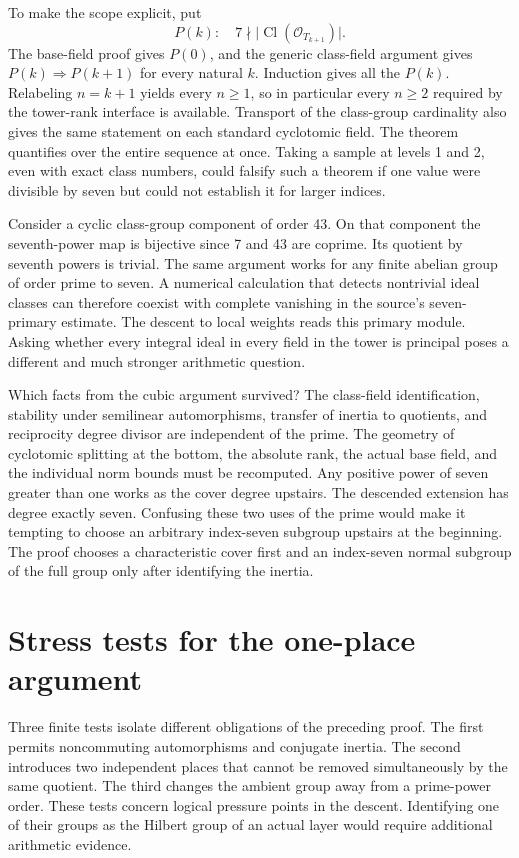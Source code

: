 \documentclass[12pt,letterpaper]{article}
\begin{document}
To make the scope explicit, put
\[
P(k):\quad 7\nmid \big|\operatorname{Cl}(\mathcal O_{T_{k+1}})\big|.
\]
The base-field proof gives \(P(0)\), and the generic class-field argument gives \(P(k)\Rightarrow P(k+1)\) for every natural \(k\). Induction gives all the \(P(k)\). Relabeling \(n=k+1\) yields every \(n\ge1\), so in particular every \(n\ge2\) required by the tower-rank interface is available. Transport of the class-group cardinality also gives the same statement on each standard cyclotomic field. The theorem quantifies over the entire sequence at once. Taking a sample at levels 1 and 2, even with exact class numbers, could falsify such a theorem if one value were divisible by seven but could not establish it for larger indices.

Consider a cyclic class-group component of order 43. On that component the seventh-power map is bijective since 7 and 43 are coprime. Its quotient by seventh powers is trivial. The same argument works for any finite abelian group of order prime to seven. A numerical calculation that detects nontrivial ideal classes can therefore coexist with complete vanishing in the source's seven-primary estimate. The descent to local weights reads this primary module. Asking whether every integral ideal in every field in the tower is principal poses a different and much stronger arithmetic question.

Which facts from the cubic argument survived? The class-field identification, stability under semilinear automorphisms, transfer of inertia to quotients, and reciprocity degree divisor are independent of the prime. The geometry of cyclotomic splitting at the bottom, the absolute rank, the actual base field, and the individual norm bounds must be recomputed. Any positive power of seven greater than one works as the cover degree upstairs. The descended extension has degree exactly seven. Confusing these two uses of the prime would make it tempting to choose an arbitrary index-seven subgroup upstairs at the beginning. The proof chooses a characteristic cover first and an index-seven normal subgroup of the full group only after identifying the inertia.

\section{Stress tests for the one-place argument}
\label{sec:sevencontrols}
Three finite tests isolate different obligations of the preceding proof. The first permits noncommuting automorphisms and conjugate inertia. The second introduces two independent places that cannot be removed simultaneously by the same quotient. The third changes the ambient group away from a prime-power order. These tests concern logical pressure points in the descent. Identifying one of their groups as the Hilbert group of an actual layer would require additional arithmetic evidence.
\end{document}
